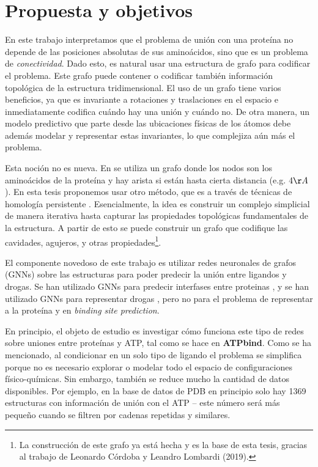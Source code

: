 \documentclass[
    left=2.0cm,         %
    right=2.0cm,        %
    top=2.0cm,          %
    bottom=2.5cm,         %
    bindingoffset=6mm,  %
    nohyphenation=false %
]{eiti/eiti-thesis}
\begin{document}

\newpage
\section{Propuesta y objetivos}
En este trabajo interpretamos que el problema de unión con una proteína no depende 
de las posiciones absolutas de sus aminoácidos, sino que es un problema de 
\textit{conectividad}. Dado esto, es natural usar una
estructura de grafo para codificar el problema. Este grafo puede contener o 
codificar también información topológica de la estructura tridimensional. El uso
de un grafo tiene varios beneficios, ya que es invariante a rotaciones y 
traslaciones en el espacio e inmediatamente codifica cuándo hay una unión y cuándo
no. De otra manera, un modelo predictivo que parte desde las ubicaciones físicas 
de los átomos debe además modelar y representar estas invariantes, lo que complejiza
aún más el problema.

Esta noción no es nueva. En \cite{fout2017proteininterface} se utiliza un grafo
donde los nodos son los aminoácidos de la proteína y hay arista si están hasta
cierta distancia (e.g. $4\AA$). En esta tesis proponemos usar otro método, 
que es a través de técnicas de homología persistente \cite{edelsbrunner2008perseus}. 
Esencialmente, la idea es construir un complejo simplicial de manera
iterativa hasta capturar las propiedades topológicas fundamentales de la estructura.
A partir de esto se puede construir un grafo que codifique las cavidades, agujeros, y
otras propiedades\footnote{La construcción de este grafo ya está hecha y es la base
de esta tesis, gracias al trabajo de Leonardo Córdoba y Leandro Lombardi (2019).}.


El componente novedoso de este trabajo es utilizar redes neuronales de grafos (GNNs) sobre
las estructuras para poder predecir la unión entre ligandos y drogas. Se han utilizado
GNNs para predecir interfases entre proteinas \cite{fout2017proteininterface}, y se han 
utilizado GNNs para representar drogas \cite{tsubaki2018CPIgnn}, pero no para el problema 
de representar a la proteína y en \textit{binding site prediction}. 

En principio, el objeto de estudio es investigar cómo funciona este tipo de redes
sobre uniones entre proteínas y ATP, tal como se hace en \textbf{ATPbind}\cite{atpbind}.
Como se ha mencionado, al condicionar en un solo tipo de ligando el problema se
simplifica porque no es necesario explorar o modelar todo el espacio de configuraciones 
físico-químicas.
Sin embargo, también se reduce mucho la cantidad de datos disponibles. Por ejemplo,
en la base de datos de PDB en principio solo hay 1369 estructuras con información de 
unión con el ATP -- este número será más pequeño cuando se filtren por cadenas
repetidas y similares.
\end{document}
